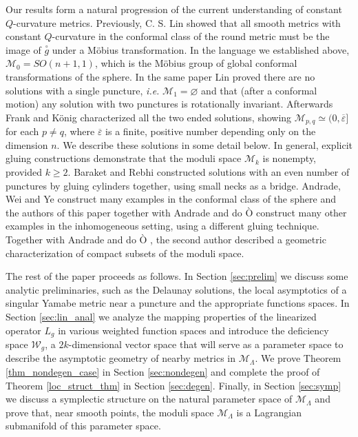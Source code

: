 \documentclass[reqno,11pt]{amsart}
\theoremstyle{tttheorem}
\begin{document}
Our results form a natural progression of the current understanding 
of constant $Q$-curvature metrics. Previously, C. S. Lin \cite{Lin} 
showed that all smooth metrics with constant $Q$-curvature in the 
conformal class of the round metric must be the image of $\overset{\circ}{g}$ 
under a M\"obius transformation. In the language we established above, 
$\mathcal{M}_0 = SO(n+1,1)$, which is the M\"obius group of global conformal 
transformations of the sphere. In the same paper Lin proved there are no 
solutions with a single puncture, {\it i.e.} $\mathcal{M}_1 = \varnothing$ 
and that (after a conformal motion) any solution with two punctures is 
rotationally invariant. Afterwards Frank and K\"onig \cite{FK} characterized 
all the two ended solutions, showing $\mathcal{M}_{p,q} \simeq (0,\overline{\varepsilon}]$
for each $p \neq q$, where $\overline{\varepsilon}$ is a finite, positive 
number depending only on the dimension $n$. We describe these solutions 
in some detail below. In general, explicit gluing constructions demonstrate 
that the moduli space $\mathcal{M}_k$ is 
nonempty, provided $k \geq 2$. Baraket and Rebhi \cite{BR} constructed 
solutions with an even number of punctures by gluing cylinders together, 
using small necks as a bridge. Andrade, Wei and Ye \cite{del-ends2} 
construct many examples in the conformal class of the sphere and 
the authors of this paper together with Andrade and do \`O \cite{del-ends} 
construct many other examples in the inhomogeneous setting, using a different gluing 
technique. Together with Andrade and do \`O \cite{compactness}, the second author 
described a geometric characterization of compact subsets of the moduli space. 

The rest of the paper proceeds as follows. In Section \ref{sec:prelim} 
we discuss some analytic preliminaries, such as the Delaunay solutions, 
the local asymptotics of a singular Yamabe metric near a puncture 
and the appropriate functions spaces. In Section \ref{sec:lin_anal} 
we analyze the mapping properties of the linearized operator $L_g$ 
in various weighted function spaces and introduce the deficiency 
space $\mathcal{W}_g$, a $2k$-dimensional vector space that will serve as a 
parameter space to describe the asymptotic geometry of nearby metrics in 
$\mathcal{M}_\Lambda$. We prove Theorem \ref{thm_nondegen_case}
in Section \ref{sec:nondegen} and complete the proof of Theorem \ref{loc_struct_thm}
in Section \ref{sec:degen}. Finally, in Section \ref{sec:symp} we discuss 
a symplectic structure on the natural parameter space of 
$\mathcal{M}_\Lambda$ and prove that, near smooth points, 
the moduli space $\mathcal{M}_\Lambda$ is a Lagrangian submanifold of 
this parameter space. 
\end{document}
